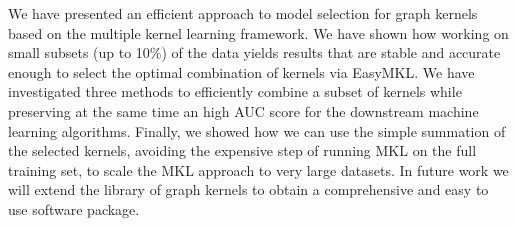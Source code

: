 \documentclass{esannV2}
\newcommand{\1}{{\bf 1}}
\begin{document}
We have presented an efficient approach to model selection for graph kernels
based on the multiple kernel learning framework. We have shown how working on
small subsets (up to 10\%) of the data yields results that are stable and
accurate enough to select the optimal combination of kernels via EasyMKL.
We have investigated three methods to efficiently combine a subset of
kernels while preserving at the same time an high AUC score for the downstream
machine learning algorithms. Finally, we showed how we can use the simple
summation of the selected kernels, avoiding the expensive step of running MKL
on the full training set, to scale the MKL approach to very large
datasets.
In future work we will extend the library of graph kernels to obtain a
comprehensive and easy to use software package.  


\begin{footnotesize}







\end{footnotesize}

\end{document}
